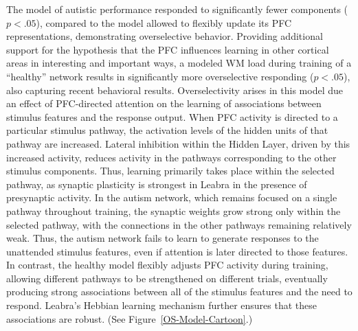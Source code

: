 The model of autistic performance responded to significantly fewer components ($p < .05$), compared to the model allowed to flexibly update its PFC representations, demonstrating overselective behavior.  Providing additional support for the hypothesis that the PFC influences learning in other cortical areas in interesting and important ways, a modeled WM load during training of a ``healthy'' network results in significantly more overselective responding ($p < .05$), also capturing recent behavioral results.  Overselectivity arises in this model due an effect of PFC-directed attention on the learning of associations between stimulus features and the response output.  When PFC activity is directed to a particular stimulus pathway, the activation levels of the hidden units of that pathway are increased.  Lateral inhibition within the Hidden Layer, driven by this increased activity, reduces activity in the pathways corresponding to the other stimulus components.  Thus, learning primarily takes place within the selected pathway, as synaptic plasticity is strongest in Leabra in the presence of presynaptic activity.  In the autism network, which remains focused on a single pathway throughout training, the synaptic weights grow strong only within the selected pathway, with the connections in the other pathways remaining relatively weak.  Thus, the autism network fails to learn to generate responses to the unattended stimulus features, even if attention is later directed to those features.  In contrast, the healthy model flexibly adjusts PFC activity during training, allowing different pathways to be strengthened on different trials, eventually producing strong associations between all of the stimulus features and the need to respond.  Leabra's Hebbian learning mechanism further ensures that these associations are robust. (See Figure~\ref{OS-Model-Cartoon}.)


